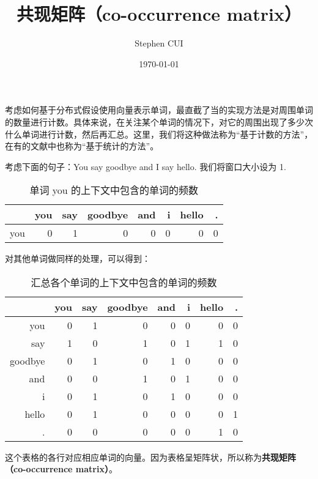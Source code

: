 \documentclass{article}
\title{共现矩阵（co-occurrence matrix）}
\author{Stephen CUI}
\date{\today}
\begin{document}
\maketitle
考虑如何基于分布式假设使用向量表示单词，最直截了当的实现方法是对周围单词的数量进行计数。具体来说，在关注某个单词的情况下，对它的周围出现了多少次什么单词进行计数，然后再汇总。这里，我们将这种做法称为“基于计数的方法”，在有的文献中也称为“基于统计的方法”。

考虑下面的句子：You say goodbye and I say hello. 我们将窗口大小设为 1.

\begin{table}[h]
    \centering
    \caption{单词 you 的上下文中包含的单词的频数}
    \begin{tabular}{rrrrrrrr}
        \hline
            & you & say & goodbye & and & i & hello & . \\
        \hline
        you & 0   & 1   & 0       & 0   & 0 & 0     & 0 \\
        \hline
    \end{tabular}
\end{table}

对其他单词做同样的处理，可以得到：
\begin{table}[h]
    \centering
    \caption{汇总各个单词的上下文中包含的单词的频数}
    \begin{tabular}{rrrrrrrr}
        \hline
                & you & say & goodbye & and & i & hello & . \\
        \hline
        you     & 0   & 1   & 0       & 0   & 0 & 0     & 0 \\
        say     & 1   & 0   & 1       & 0   & 1 & 1     & 0 \\
        goodbye & 0   & 1   & 0       & 1   & 0 & 0     & 0 \\
        and     & 0   & 0   & 1       & 0   & 1 & 0     & 0 \\
        i       & 0   & 1   & 0       & 1   & 0 & 0     & 0 \\
        hello   & 0   & 1   & 0       & 0   & 0 & 0     & 1 \\
        .       & 0   & 0   & 0       & 0   & 0 & 1     & 0 \\
        \hline
    \end{tabular}
\end{table}

这个表格的各行对应相应单词的向量。因为表格呈矩阵状，所以称为\textbf{共现矩阵（co-occurrence matrix）}。
\end{document}

